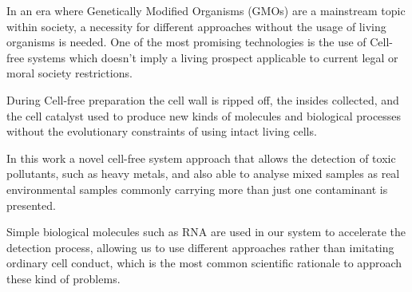 In an era where Genetically Modified Organisms (GMOs) are a mainstream topic within society, a necessity for different approaches without the usage of living organisms is needed. One of the most promising technologies is the use of Cell-free systems which doesn't imply a living prospect applicable to current legal or moral society restrictions.

During Cell-free preparation the cell wall is ripped off, the insides collected, and the cell catalyst used to produce new kinds of molecules and biological processes without the evolutionary constraints of using intact living cells.

In this work a novel cell-free system approach that allows the detection of toxic pollutants, such as heavy metals, and also able to analyse mixed samples as real environmental samples commonly carrying more than just one contaminant is presented. 

Simple biological molecules such as RNA are used in our system to accelerate the detection process, allowing us to use different approaches rather than imitating ordinary cell conduct, which is the most common scientific rationale to approach these kind of problems.